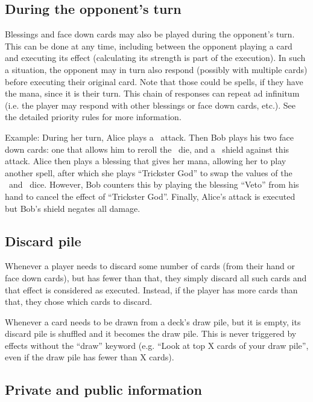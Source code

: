 \documentclass[dvipsnames,parskip,a4paper]{scrartcl}
\newcommand{\iconsize}{3.4mm}
\newcommand{\icondepth}{0.45mm}
\newcommand{\icon}[1]{\raisebox{-\icondepth}{\texttt{[image:  \#1 ]}}}
\newcommand{\fire}{\icon{icons/fire.png}}
\newcommand{\water}{\icon{icons/water.png}}
\begin{document}
\subsection*{During the opponent's turn}

Blessings and face down cards may also be played during the opponent's turn. This can be done at any time, including between the opponent playing a card and executing its effect (calculating its strength is part of the execution). In such a situation, the opponent may in turn also respond (possibly with multiple cards) before executing their original card. Note that those could be spells, if they have the mana, since it is their turn. This chain of responses can repeat ad infinitum (i.e. the player may respond with other blessings or face down cards, etc.). See the detailed priority rules for more information.

\vspace{4pt}

Example: During her turn, Alice plays a \fire \ attack. Then Bob plays his two face down cards: one that allows him to reroll the \fire \ die, and a \water \ shield against this attack. Alice then plays a blessing that gives her mana, allowing her to play another spell, after which she plays ``Trickster God'' to swap the values of the \fire \ and \water \ dice. However, Bob counters this by playing the blessing ``Veto'' from his hand to cancel the effect of ``Trickster God''. Finally, Alice's attack is executed but Bob's shield negates all damage.

\subsection*{Discard pile}

Whenever a player needs to discard some number of cards (from their hand or face down cards), but has fewer than that, they simply discard all such cards and that effect is considered as executed. Instead, if the player has more cards than that, they chose which cards to discard.

\vspace*{4pt}

Whenever a card needs to be drawn from a deck's draw pile, but it is empty, its discard pile is shuffled and it becomes the draw pile. This is never triggered by effects without the ``draw'' keyword (e.g. ``Look at top X cards of your draw pile'', even if the draw pile has fewer than X cards).

\subsection*{Private and public information}
\end{document}
